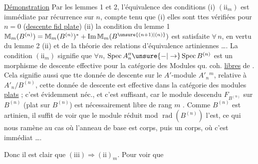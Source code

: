 \uline{Démonstration}  Par les lemmes 1  et 2, l'équivalence des
conditions (i)  $(\mathrm{ii}_m)$  est immédiate par récurrence
sur $n$, compte tenu que (i) elles sont ttes
vérifiées pour $n=0$ (\uline{descente fid plate}) (ii) la condition
du lemme 1  $\mathbb M_m(B^{(n)})=\mathbb M_m(B^{(n)})^*+\operatorname{Im}\mathbb M_m(B^{\unsure{(n+1)|(n)}})$
est satisfaite  $\forall\,n$, en vertu du lemme 2 (ii)
et de la théorie des relations d'équivalence
artiniennes \ldots. La condition $(\mathrm{ii}_m)$ signifie que $\forall n$,
$\operatorname{Spec} A''_n\unsure{-|\to}\operatorname{Spec} B^{(n)}$ est un morphisme de descente
effective  pour la catégorie des Modules qu. coh.
\uline{libres} de  . Cela signifie aussi que tte
donnée de descente sur le $A'$-module $A'_n{}^m$,
relative à $A'_n/B^{(n)}$, cette donnée de descente
est effective dans la catégorie des modules \uline{plats} ;
c'est évidemment néc., et c'est suffisant, car
 le module descendu $F_{B^{(n)}}$ sur $B^{(n)}$ (plat sur $B^{(n)}$) est
nécessairement libre de rang $m$ . Comme $B^{(n)}$ est
artinien, il suffit de voir que le module
réduit mod $\operatorname{rad}(B^{(n)})$ l'est, ce qui nous ramène
au cas où l'anneau de base est   corps, puis
un  corps, où c'est immédiat \ldots.

Donc il est clair que $(\mathrm{iii})\Rightarrow(\mathrm{ii})_m$. Pour voir que
